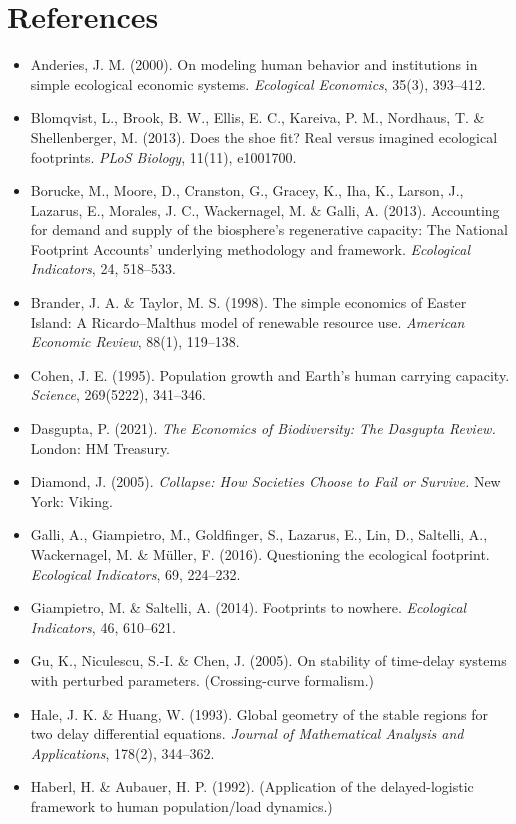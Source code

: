 \documentclass[11pt]{article}
\begin{document}
\section{References}

\begin{itemize}
\item Anderies, J. M. (2000). On modeling human behavior and institutions in simple ecological economic systems. \emph{Ecological Economics}, 35(3), 393–412.
\item Blomqvist, L., Brook, B. W., Ellis, E. C., Kareiva, P. M., Nordhaus, T. \& Shellenberger, M. (2013). Does the shoe fit? Real versus imagined ecological footprints. \emph{PLoS Biology}, 11(11), e1001700.
\item Borucke, M., Moore, D., Cranston, G., Gracey, K., Iha, K., Larson, J., Lazarus, E., Morales, J. C., Wackernagel, M. \& Galli, A. (2013). Accounting for demand and supply of the biosphere's regenerative capacity: The National Footprint Accounts' underlying methodology and framework. \emph{Ecological Indicators}, 24, 518–533.
\item Brander, J. A. \& Taylor, M. S. (1998). The simple economics of Easter Island: A Ricardo–Malthus model of renewable resource use. \emph{American Economic Review}, 88(1), 119–138.
\item Cohen, J. E. (1995). Population growth and Earth's human carrying capacity. \emph{Science}, 269(5222), 341–346.
\item Dasgupta, P. (2021). \emph{The Economics of Biodiversity: The Dasgupta Review.} London: HM Treasury.
\item Diamond, J. (2005). \emph{Collapse: How Societies Choose to Fail or Survive.} New York: Viking.
\item Galli, A., Giampietro, M., Goldfinger, S., Lazarus, E., Lin, D., Saltelli, A., Wackernagel, M. \& Müller, F. (2016). Questioning the ecological footprint. \emph{Ecological Indicators}, 69, 224–232.
\item Giampietro, M. \& Saltelli, A. (2014). Footprints to nowhere. \emph{Ecological Indicators}, 46, 610–621.
\item Gu, K., Niculescu, S.-I. \& Chen, J. (2005). On stability of time-delay systems with perturbed parameters. (Crossing-curve formalism.)
\item Hale, J. K. \& Huang, W. (1993). Global geometry of the stable regions for two delay differential equations. \emph{Journal of Mathematical Analysis and Applications}, 178(2), 344–362.
\item Haberl, H. \& Aubauer, H. P. (1992). (Application of the delayed-logistic framework to human population/load dynamics.)

\end{itemize}
\end{document}
